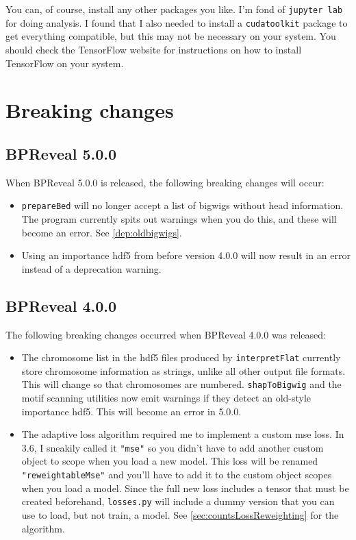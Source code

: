 \documentclass{article}
\begin{document}
You can, of course, install any other packages you like.
I'm fond of \texttt{jupyter lab} for doing analysis.
I found that I also needed to install a \texttt{cudatoolkit} package to get
everything compatible, but this may not be necessary on your system.
You should check the TensorFlow website for instructions on how to install
TensorFlow on your system.


\newpage

\section{Breaking changes}


\subsection{BPReveal 5.0.0}
When BPReveal 5.0.0 is released, the following breaking changes will occur:
\begin{itemize}
    \item \texttt{prepareBed} will no longer accept a list of bigwigs without
        head information.
        The program currently spits out warnings when you do this, and these
        will become an error.
        See \ref{dep:oldbigwigs}.
    \item Using an importance hdf5 from before version 4.0.0 will now result
        in an error instead of a deprecation warning.
\end{itemize}

\subsection{BPReveal 4.0.0}
The following breaking changes occurred when BPReveal 4.0.0 was released:
\begin{itemize}
    \item The chromosome list in the hdf5 files produced by
        \texttt{interpretFlat} currently store chromosome information as
        strings, unlike all other output file formats.
        This will change so that chromosomes are numbered.
        \texttt{shapToBigwig} and the motif scanning utilities now emit
        warnings if they detect an old-style importance hdf5. This will become
        an error in 5.0.0.
    \item The adaptive loss algorithm required me to implement a custom mse
        loss.
        In 3.6, I sneakily called it \texttt{"mse"} so you didn't have to add
        another custom object to scope when you load a new model.
        This loss will be renamed \texttt{"reweightableMse"} and you'll have to
        add it to the custom object scopes when you load a model.
        Since the full new loss includes a tensor that must be created
        beforehand, \texttt{losses.py} will include a dummy version that you
        can use to load, but not train, a model.
        See \ref{sec:countsLossReweighting} for the algorithm.
\end{itemize}
\end{document}
